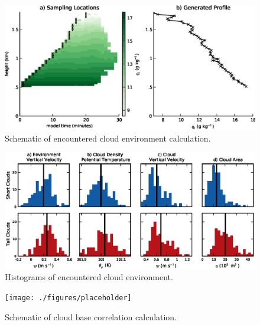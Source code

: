 \documentclass[acp]{copernicus}
\begin{document}
\begin{figure}[t]
\vspace*{2mm}
\begin{center}
\includegraphics[width=\textwidth]{./figures/cloud_environment_schematic}
\end{center}
\caption{Schematic of encountered cloud environment calculation.}
\label{fig:cloud_environment_schematic}
\end{figure}

\begin{figure}[t]
\vspace*{2mm}
\begin{center}
\includegraphics[width=\textwidth]{./figures/cloud_environment_histograms}
\end{center}
\caption{Histograms of encountered cloud environment.}
\label{fig:cloud_envionment_histograms}
\end{figure}

\begin{figure}[t]
\vspace*{2mm}
\begin{center}
\texttt{[image: ./figures/placeholder]}
\end{center}
\caption{Schematic of cloud base correlation calculation.}
\label{fig:cloud_base_schematic}
\end{figure}
\end{document}
